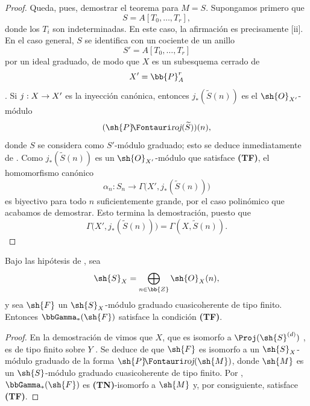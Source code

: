 \documentclass[oneside]{amsart}
\makeatletter
\newcommand{\ega@arrow}[2]{\mathchoice{#1}{#2}{#2}{#2}}
\renewcommand{\to}{\ega@arrow{\longrightarrow}{\rightarrow}}
\newcommand*{\ega@sheafop}[3]{\sh{#1}#2\textup{\kern-2.2pt{\Fontauri\slshape #3}}}
\newcommand*{\shProj}{\ega@sheafop{P}{}{roj}}
\let\EGAOriginalLabel\label
\renewcommand{\label}[1]{\phantomsection\EGAOriginalLabel{#1}}
\makeatother
\begin{document}
\begin{proof}
Queda, pues, demostrar el teorema para $M=S$.
Supongamos primero que
\[
  S=A[T_0,\ldots,T_r],
\]
donde los $T_i$ son indeterminadas.
En este caso, la afirmación es precisamente [ii].
En el caso general, $S$ se identifica con un cociente de un anillo
\[
  S'=A[T_0,\ldots,T_r]
\]
por un ideal graduado, de modo que $X$ es un subesquema cerrado de
\[
  X'=\bb{P}_A^r
\]
.
Si $j:X\to X'$ es la inyección canónica, entonces $j_*(\widetilde{S}(n))$ es el $\sh{O}_{X'}$-módulo
\[
  (\shProj(\widetilde{S}))(n),
\]
donde $S$ se considera como $S'$-módulo graduado; esto se deduce inmediatamente de .
Como $j_*(\widetilde{S}(n))$ es un $\sh{O}_{X'}$-módulo que satisface \textbf{(TF)}, el homomorfismo canónico
\[
  \alpha_n:S_n\longrightarrow
  \Gamma\bigl(X',j_*(\widetilde{S}(n))\bigr)
\]
es biyectivo para todo $n$ suficientemente grande, por el caso polinómico que acabamos de demostrar.
Esto termina la demostración, puesto que
\[
  \Gamma\bigl(X',j_*(\widetilde{S}(n))\bigr)
  =\Gamma(X,\widetilde{S}(n)).
\]
\end{proof}

\begin{corollary}[2.3.2]
\label{III.2.3.2}
Bajo las hipótesis de \textup{}, sea
\[
  \sh{S}_X=\bigoplus_{n\in\bb{Z}}\sh{O}_X(n),
\]
y sea $\sh{F}$ un $\sh{S}_X$-módulo graduado cuasicoherente de tipo finito.
Entonces $\bbGamma_*(\sh{F})$ satisface la condición \textup{\textbf{(TF)}}.
\end{corollary}

\begin{proof}
En la demostración de  vimos que $X$, que es isomorfo a $\Proj(\sh{S}^{(d)})$ , es de tipo finito sobre $Y$ .
Se deduce de  que $\sh{F}$ es isomorfo a un $\sh{S}_X$-módulo graduado de la forma $\shProj(\sh{M})$, donde $\sh{M}$ es un $\sh{S}$-módulo graduado cuasicoherente de tipo finito.
Por , $\bbGamma_*(\sh{F})$ es \textbf{(TN)}-isomorfo a $\sh{M}$ y, por consiguiente, satisface \textbf{(TF)}.
\end{proof}
\end{document}
